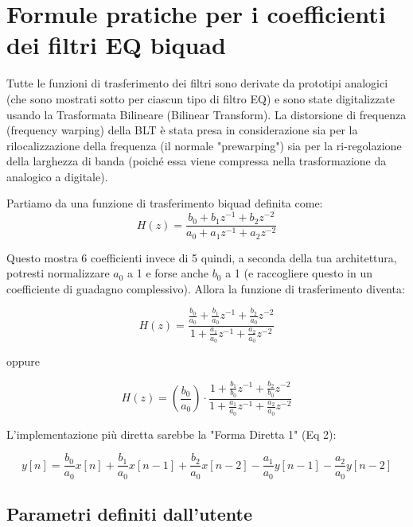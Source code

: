 

\chapter{Formule pratiche per i coefficienti dei filtri EQ biquad}

Tutte le funzioni di trasferimento dei filtri sono derivate da prototipi analogici (che sono mostrati sotto per ciascun tipo di filtro EQ) e sono state digitalizzate usando la Trasformata Bilineare (Bilinear Transform). La distorsione di frequenza (frequency warping) della BLT è stata presa in considerazione sia per la rilocalizzazione della frequenza (il normale "prewarping") sia per la ri-regolazione della larghezza di banda (poiché essa viene compressa nella trasformazione da analogico a digitale).

Partiamo da una funzione di trasferimento biquad definita come:
\begin{equation}
H(z) = \frac{b_0 + b_1 z^{-1} + b_2 z^{-2}}{a_0 + a_1 z^{-1} + a_2 z^{-2}} \tag{Eq 1}
\end{equation}

Questo mostra 6 coefficienti invece di 5 quindi, a seconda della tua architettura, potresti normalizzare $a_0$ a 1 e forse anche $b_0$ a 1 (e raccogliere questo in un coefficiente di guadagno complessivo). Allora la funzione di trasferimento diventa:

\begin{equation}
H(z) = \frac{\frac{b_0}{a_0} + \frac{b_1}{a_0} z^{-1} + \frac{b_2}{a_0} z^{-2}}{1 + \frac{a_1}{a_0} z^{-1} + \frac{a_2}{a_0} z^{-2}} \tag{Eq 2}
\end{equation}

oppure

\begin{equation}
H(z) = \left(\frac{b_0}{a_0}\right) \cdot \frac{1 + \frac{b_1}{b_0} z^{-1} + \frac{b_2}{b_0} z^{-2}}{1 + \frac{a_1}{a_0} z^{-1} + \frac{a_2}{a_0} z^{-2}} \tag{Eq 3}
\end{equation}

L'implementazione più diretta sarebbe la "Forma Diretta 1" (Eq 2):

\begin{equation}
y[n] = \frac{b_0}{a_0} x[n] + \frac{b_1}{a_0} x[n-1] + \frac{b_2}{a_0} x[n-2] - \frac{a_1}{a_0} y[n-1] - \frac{a_2}{a_0} y[n-2] \tag{Eq 4}
\end{equation}

\section*{Parametri definiti dall'utente}

